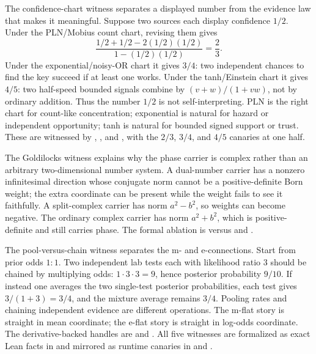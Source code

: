 \documentclass[11pt,openany]{report}
\begin{document}
The confidence-chart witness separates a displayed number from the
evidence law that makes it meaningful.  Suppose two sources each display
confidence $1/2$.  Under the PLN/Mobius count chart, revising them gives
\[
  \frac{1/2+1/2-2(1/2)(1/2)}{1-(1/2)(1/2)}
  = \frac{2}{3}.
\]
Under the exponential/noisy-OR chart it gives $3/4$: two independent
chances to find the key succeed if at least one works.  Under the
tanh/Einstein chart it gives $4/5$: two half-speed bounded signals
combine by $(v+w)/(1+vw)$, not by ordinary addition.  Thus the number
$1/2$ is not self-interpreting.  PLN is the right chart for count-like
concentration; exponential is natural for hazard or independent
opportunity; tanh is natural for bounded signed support or trust.  These
are witnessed by
,
, and
, with the $2/3$, $3/4$,
and $4/5$ canaries at one half.

The Goldilocks witness explains why the phase carrier is complex rather
than an arbitrary two-dimensional number system.  A dual-number carrier
has a nonzero infinitesimal direction whose conjugate norm cannot be a
positive-definite Born weight; the extra coordinate can be present while
the weight fails to see it faithfully.  A split-complex carrier has
norm $a^2-b^2$, so weights can become negative.  The ordinary complex
carrier has norm $a^2+b^2$, which is positive-definite and still carries
phase.  The formal ablation is
 versus
 and
.

The pool-versus-chain witness separates the m- and e-connections.
Start from prior odds $1:1$.  Two independent lab tests each with
likelihood ratio $3$ should be chained by multiplying odds:
$1\cdot 3\cdot 3=9$, hence posterior probability $9/10$.  If instead
one averages the two single-test posterior probabilities, each test
gives $3/(1+3)=3/4$, and the mixture average remains $3/4$.  Pooling
rates and chaining independent evidence are different operations.  The
m-flat story is straight in mean coordinate; the e-flat story is
straight in log-odds coordinate.  The derivative-backed handles are
 and
.  All five
witnesses are formalized as exact Lean facts in
 and mirrored as
runtime canaries in
and
.
\end{document}
